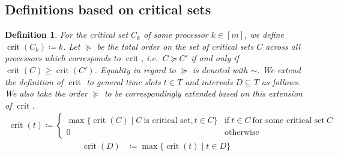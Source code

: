 \documentclass[a4paper]{article}
\DeclareMathOperator{\argmax}{argmax}
\DeclareMathOperator{\crit}{crit}
\newtheorem{definition}[theorem]{Definition}
\begin{document}

\subsection{Definitions based on critical sets}

\begin{definition}
  For the critical set $C_k$ of some processor $k \in [m]$, we define $\crit(C_k) \coloneqq k$.
  Let $\succeq$ be the total order on the set of critical sets $C$ across all processors which corresponds to $\crit$, i.e.\ $C \succeq C'$ if and only if $\crit(C) \geq \crit(C')$.
  Equality in regard to $\succeq$ is denoted with $\sim$.
  We extend the definition of $\crit$ to general time slots $t \in T$ and intervals $D \subseteq T$ as follows.
  We also take the order $\succeq$ to be correspondingly extended based on this extension of $\crit$.
  \begin{align}
    \crit(t) \coloneqq
    \begin{cases}
      \max \{\crit(C) \mid C~\text{is critical set},  t \in C \}
      & \text{if}~t \in C~\text{for some critical set}~C
      \\0
      & \text{otherwise}
    \end{cases}
  \end{align}
  \begin{align}
    \crit(D) &\coloneqq \max \{ \crit(t) \mid t \in D \}
  \end{align}
\end{definition}
\end{document}
